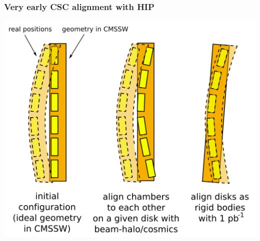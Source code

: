 \documentclass[compress]{beamer}
\begin{document}


\begin{frame}
\frametitle{Very early CSC alignment with HIP}
\begin{center} \includegraphics[width=0.9\linewidth]{plan.png} \end{center}
\end{frame}
\end{document}
